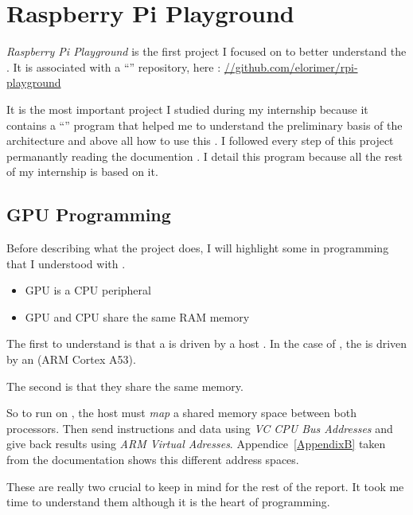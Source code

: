 \section{Raspberry Pi Playground}

\emph{Raspberry Pi Playground} \parencite{refRpiPlayground} is the first project I focused on to better understand the \vc. It is associated with a \enquote{} repository, here : \url{//github.com/elorimer/rpi-playground}

It is the most important project I studied during my internship because it contains a \enquote{} program that helped me to understand the preliminary basis of the \vc{} architecture and above all how to use this . I followed every step of this project permanantly reading the \vc{} documention \parencite{refVC}. I detail this program because all the rest of my internship is based on it.


\subsection{GPU Programming}
\label{concepts}
Before describing what the  project does, I will highlight some  in \vc{} programming that I understood with \parencite{refRpiPlayground}.

\begin{itemize}
	\item GPU is a CPU peripheral
	\item GPU and CPU share the same RAM memory
\end{itemize}

The first  to understand is that a  is driven by a host . In the case of \bcm, the \vc{} is driven by an \cpu{}(ARM Cortex A53).

The second  is that they share the same  memory.

So to run  on , the host  must \emph{map} a shared memory space between both processors. Then  send instructions and data using \emph{VC CPU Bus Addresses} and  give back results using \emph{ARM Virtual Adresses}.
Appendice~\ref{AppendixB} taken from the \bcm{} documentation \parencite{refBCM} shows this different address spaces.

These are really two crucial  to keep in mind for the rest of the report. It took me time to understand them although it is the heart of \vc{} programming.


